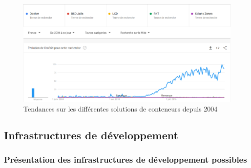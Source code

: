 \documentclass[
    iai, %
    il, %
]{heig-tb}
\begin{document}
\begin{center}
    \begin{figure}
        \includegraphics[width=\textwidth]{./assets/figures/google-trend-containers-2022.png}
        \caption[Tendances solutions de conteneurs]{Tendances sur les différentes solutions de conteneurs depuis 2004 \label{containers-trends}}
    \end{figure}
\end{center}

\subsection{Infrastructures de développement}

\subsubsection{Présentation des infrastructures de développement possibles}
\end{document}
